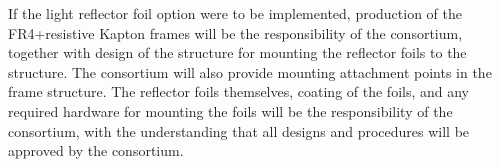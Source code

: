 
If the light reflector foil option were to be implemented, production of the FR4+resistive Kapton  frames will be the responsibility of the  consortium, together with design of the structure for mounting the  reflector foils to the  structure.  The  consortium will also provide mounting attachment points in the  frame structure.
 The reflector foils themselves,  coating of the  foils, and any required hardware for mounting the foils will be the responsibility of the  consortium, with the understanding that all designs and procedures will be approved by the  consortium. 



